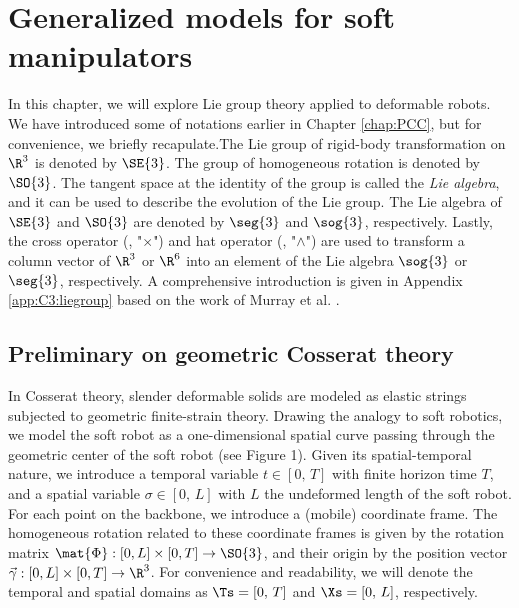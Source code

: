 \section{Generalized models for soft manipulators} \label{sec:chap3_model}
In this chapter, we will explore Lie group theory applied to deformable robots. We have introduced some of notations earlier in Chapter \ref{chap:PCC}, but for convenience, we briefly recapulate.The Lie group of rigid-body transformation on $\R^3$ is denoted by $\SE{3}$. The group of homogeneous rotation is denoted by $\SO{3}$. The tangent space at the identity of the group is called the \textit{Lie algebra}, and it can be used to describe the evolution of the Lie group. The Lie algebra of $\SE{3}$ and $\SO{3}$ are denoted by $\seg{3}$ and $\sog{3}$, respectively. Lastly, the cross operator (\ie, "$\times$") and hat operator (\ie, "$\wedge$") are used to transform a column vector of $\R^3$ or $\R^6$ into an element of the Lie algebra $\sog{3}$ or $\seg{3}$, respectively. A comprehensive introduction is given in Appendix \ref{app:C3:liegroup} based on the work of Murray et al. \cite{Murray1994}. 

\subsection{Preliminary on geometric Cosserat theory}
In Cosserat theory, slender deformable solids are modeled as elastic strings subjected to geometric finite-strain theory. Drawing the analogy to soft robotics, we model the soft robot as a one-dimensional spatial curve passing through the geometric center of the soft robot (see Figure 1). Given its spatial-temporal nature, we introduce a temporal variable $t \in [0,\,T]$ with finite horizon time $T$, and a spatial variable $\sigma \in [0,\,L]$ with $L$ the undeformed length of the soft robot. For each point on the backbone, we introduce a (mobile) coordinate frame. The homogeneous rotation related to these coordinate frames is given by the rotation matrix $\mat{\Phi}: [0,L] \times [0,T] \to  \SO{3}$, and their origin by the position vector $\vec{\gamma}: [0,L] \times [0,T] \to \R^3$. For convenience and readability, we will denote the temporal and spatial domains as $\Ts = [0,\,T]$ and $\Xs = [0,\,L]$, respectively.

